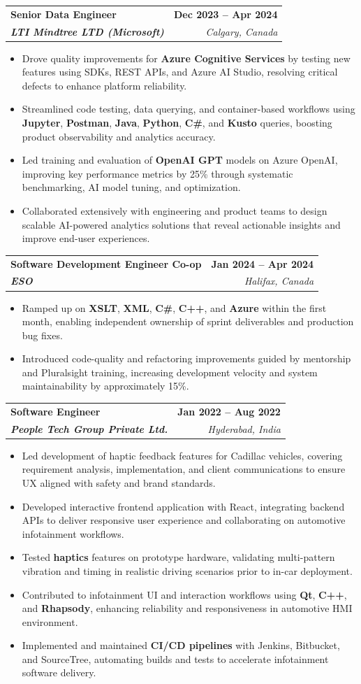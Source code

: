\documentclass[letterpaper,11pt]{article}
\makeatletter
\newcommand{\resumeItem}[1]{
  \item\small{
    {#1 \vspace{-2pt}}
  }
}
\newcommand{\resumeSubheading}[4]{
  \vspace{-2pt}\item
    \begin{tabular*}{1.0\textwidth}[t]{l@{\extracolsep{\fill}}r}
      \textbf{#1} & \textbf{\small #2} \\
      \textit{\small#3} & \textit{\small #4} \\
    \end{tabular*}\vspace{-7pt}
}
\newcommand{\resumeItemListStart}{\begin{itemize}}
\newcommand{\resumeItemListEnd}{\end{itemize}\vspace{-5pt}}
\makeatother
\begin{document}
    \resumeSubheading
      {\textbf{Senior Data Engineer}}{\textbf{Dec 2023 -- Apr 2024}}
      {\textbf{LTI Mindtree LTD (Microsoft)}}{Calgary, Canada}
      \resumeItemListStart
        \resumeItem{Drove quality improvements for \textbf{Azure Cognitive Services} by testing new features using SDKs, REST APIs, and Azure AI Studio, resolving critical defects to enhance platform reliability.}
        \resumeItem{Streamlined code testing, data querying, and container-based workflows using \textbf{Jupyter}, \textbf{Postman}, \textbf{Java}, \textbf{Python}, \textbf{C\#}, and \textbf{Kusto} queries, boosting product observability and analytics accuracy.}
        \resumeItem{Led training and evaluation of \textbf{OpenAI GPT} models on Azure OpenAI, improving key performance metrics by 25\% through systematic benchmarking, AI model tuning, and optimization.}
        \resumeItem{Collaborated extensively with engineering and product teams to design scalable AI-powered analytics solutions that reveal actionable insights and improve end-user experiences.}
      \resumeItemListEnd
    
    \resumeSubheading
      {\textbf{Software Development Engineer Co-op}}{\textbf{Jan 2024 -- Apr 2024}}
      {\textbf{ESO}}{Halifax, Canada}
      \resumeItemListStart
        \resumeItem{Ramped up on \textbf{XSLT}, \textbf{XML}, \textbf{C\#}, \textbf{C++}, and \textbf{Azure} within the first month, enabling independent ownership of sprint deliverables and production bug fixes.}
        \resumeItem{Introduced code-quality and refactoring improvements guided by mentorship and Pluralsight training, increasing development velocity and system maintainability by approximately 15\%.}
      \resumeItemListEnd

    \resumeSubheading
      {\textbf{Software Engineer}}{\textbf{Jan 2022 -- Aug 2022}}
      {\textbf{People Tech Group Private Ltd.}}{Hyderabad, India}
      \resumeItemListStart
        \resumeItem{Led development of haptic feedback features for Cadillac vehicles, covering requirement analysis, implementation, and client communications to ensure UX aligned with safety and brand standards.}
        \resumeItem{Developed interactive frontend application with React, integrating backend APIs to deliver responsive user experience and collaborating on automotive infotainment workflows.}
        \resumeItem{Tested \textbf{haptics} features on prototype hardware, validating multi-pattern vibration and timing in realistic driving scenarios prior to in-car deployment.}
        \resumeItem{Contributed to infotainment UI and interaction workflows using \textbf{Qt}, \textbf{C++}, and \textbf{Rhapsody}, enhancing reliability and responsiveness in automotive HMI environment.}
        \resumeItem{Implemented and maintained \textbf{CI/CD pipelines} with Jenkins, Bitbucket, and SourceTree, automating builds and tests to accelerate infotainment software delivery.}
      \resumeItemListEnd
\end{document}
